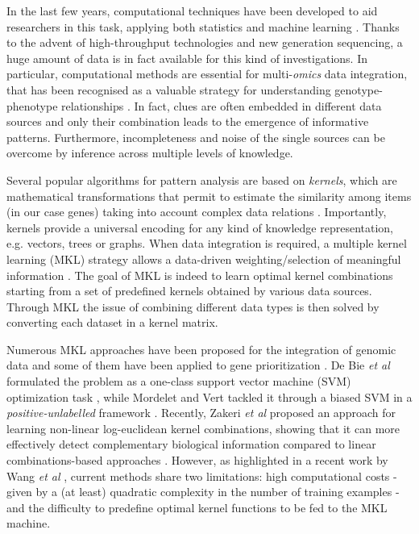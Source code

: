In the last few years, computational techniques have been developed to aid researchers in this task, applying both statistics and machine learning \cite{moreau}. Thanks to the advent of high-throughput technologies and new generation sequencing, a huge amount of data is in fact available for this kind of investigations. In particular, computational methods are essential for multi-\emph{omics} data integration, that has been recognised as a valuable strategy for understanding genotype-phenotype relationships \cite{ritchie}. In fact, clues are often embedded in different data sources and only their combination leads to the emergence of informative patterns. Furthermore, incompleteness and noise of the single sources can be overcome by inference across multiple levels of knowledge.

Several popular algorithms for pattern analysis are based on \emph{kernels}, which are mathematical transformations that permit to estimate the similarity among items (in our case genes) taking into account complex data relations \cite{cristianini}. Importantly, kernels provide a universal encoding for any kind of knowledge representation, e.g. vectors, trees or graphs. When data integration is required, a multiple kernel learning (MKL) strategy allows a data-driven weighting/selection of meaningful information \cite{gonen}. The goal of MKL is indeed to learn optimal kernel combinations starting from a set of predefined kernels obtained by various data sources. Through MKL the issue of combining different data types is then solved by converting each dataset in a kernel matrix.

Numerous MKL approaches have been proposed for the integration of genomic data \cite{wang,borgwardt} and some of them have been applied to gene prioritization \cite{debie,mkl1class,prodige,zakeri}. De Bie \emph{et al} formulated the problem as a one-class support vector machine (SVM) optimization task \cite{debie}, while Mordelet and Vert tackled it through a biased SVM in a \emph{positive-unlabelled} framework \cite{prodige,chapelle}. Recently, Zakeri \emph{et al} proposed an approach for learning non-linear log-euclidean kernel combinations, showing that it can more effectively detect complementary biological information compared to linear combinations-based approaches \cite{zakeri}. However, as highlighted in a recent work by Wang \emph{et al} \cite{wang}, current methods share two limitations: high computational costs - given by a (at least) quadratic complexity in the number of training examples - and the difficulty to predefine optimal kernel functions to be fed to the MKL machine.

